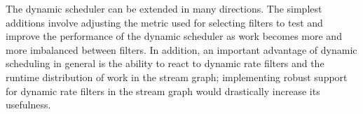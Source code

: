 The dynamic scheduler can be extended in many directions. The simplest
additions involve adjusting the metric used for selecting filters to
test and improve the performance of the dynamic scheduler as work
becomes more and more imbalanced between filters. In addition, an
important advantage of dynamic scheduling in general is the ability to
react to dynamic rate filters and the runtime distribution of work in
the stream graph; implementing robust support for dynamic rate filters
in the stream graph would drastically increase its usefulness.
